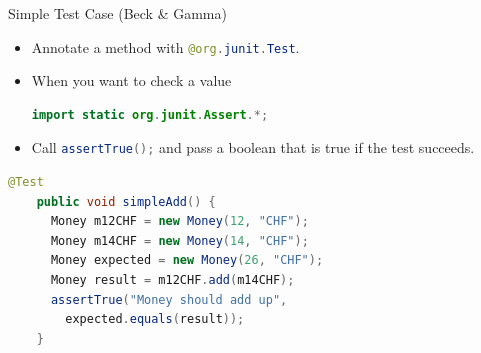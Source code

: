 \begin{Frame}[fragile]{Simple Test Case (Beck \& Gamma)}
  \begin{itemize}
    \item Annotate a method with \lstinline[language=Java]-@org.junit.Test-.
    \item When you want to check a value
      \begin{lstlisting}[language=java,gobble=8]
        import static org.junit.Assert.*;
      \end{lstlisting}
    \item Call \lstinline[language=Java]-assertTrue();- and pass a boolean that is true if the test succeeds.
  \end{itemize}

  \xxx

  \begin{lstlisting}[language=java,gobble=4]
    @Test
    public void simpleAdd() {
      Money m12CHF = new Money(12, "CHF"); 
      Money m14CHF = new Money(14, "CHF"); 
      Money expected = new Money(26, "CHF"); 
      Money result = m12CHF.add(m14CHF); 
      assertTrue("Money should add up",
        expected.equals(result));
    }
  \end{lstlisting}
\end{Frame}

